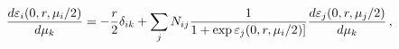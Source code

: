 \begin{equation}
\frac{d\varepsilon _{i}(0,r,\mu _{i}/2)}{d\mu _{k}}=-\frac{r}{2}\delta
_{ik}+\sum_{j}N_{ij}\frac{1}{1+\exp \varepsilon _{j}(0,r,\mu _{i}/2)]}\frac{%
d\varepsilon _{j}(0,r,\mu _{j}/2)}{d\mu _{k}}\,,  \label{de}
\end{equation}%
